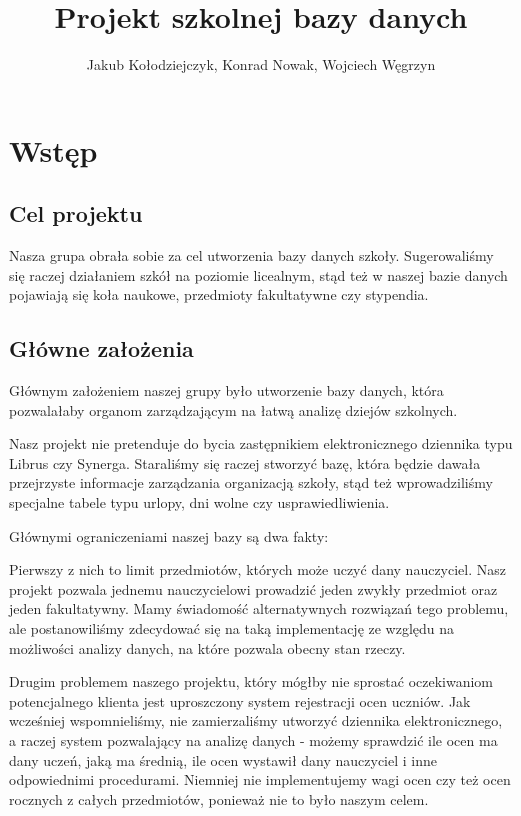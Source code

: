 \documentclass[60pt]{article}
\title{Projekt szkolnej bazy danych}
\author{Jakub Kołodziejczyk, Konrad Nowak, Wojciech Węgrzyn}
\begin{document}
\maketitle

\newpage
\tableofcontents

\newpage
\section{Wstęp}

\subsection{Cel projektu}

Nasza grupa obrała sobie za cel utworzenia bazy danych szkoły. Sugerowaliśmy się raczej działaniem szkół na poziomie licealnym, stąd też w naszej bazie danych pojawiają się koła naukowe, przedmioty fakultatywne czy stypendia. 

\subsection{Główne założenia}

Głównym założeniem naszej grupy było utworzenie bazy danych, która pozwalałaby organom zarządzającym na łatwą analizę dziejów szkolnych. 

Nasz projekt nie pretenduje do bycia zastępnikiem elektronicznego dziennika typu Librus czy Synerga. Staraliśmy się raczej stworzyć bazę, która będzie dawała przejrzyste informacje zarządzania organizacją szkoły, stąd też wprowadziliśmy specjalne tabele typu urlopy, dni wolne czy usprawiedliwienia. 

Głównymi ograniczeniami naszej bazy są dwa fakty:

Pierwszy z nich to limit przedmiotów, których może uczyć dany nauczyciel. Nasz projekt pozwala jednemu nauczycielowi prowadzić jeden zwykły przedmiot oraz jeden fakultatywny. Mamy świadomość alternatywnych rozwiązań tego problemu, ale postanowiliśmy zdecydować się na taką implementację ze względu na możliwości analizy danych, na które pozwala obecny stan rzeczy. 

Drugim problemem naszego projektu, który mógłby nie sprostać oczekiwaniom potencjalnego klienta jest uproszczony system rejestracji ocen uczniów. Jak wcześniej wspomnieliśmy, nie zamierzaliśmy utworzyć dziennika elektronicznego, a raczej system pozwalający na analizę danych - możemy sprawdzić ile ocen ma dany uczeń, jaką ma średnią, ile ocen wystawił dany nauczyciel i inne odpowiednimi procedurami. Niemniej nie implementujemy wagi ocen czy też ocen rocznych z całych przedmiotów, ponieważ nie to było naszym celem.
\end{document}
